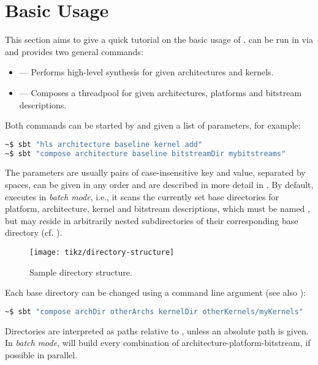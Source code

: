 \section{Basic Usage}\label{sec:basic-usage}%
This section aims to give a quick tutorial on the basic usage of \tapasco{}.
\tapasco{} can be run in \tapascohome{} via  and provides two general commands:

\begin{itemize}
  \item {} --- Performs high-level synthesis for given architectures and kernels.
  \item {} --- Composes a threadpool for given architectures, platforms and bitstream descriptions.
\end{itemize}

Both commands can be started by  and given a list of parameters, for example:
%
\begin{lstlisting}[language=bash]
~$ sbt "hls architecture baseline kernel add"
~$ sbt "compose architecture baseline bitstreamDir mybitstreams"
\end{lstlisting}
%
The parameters are usually pairs of case-insensitive key and value, separated by spaces, can be given in any order and are described in more detail in .
By default, \tapasco{} executes in \emph{batch mode}, i.e., it scans the currently set base directories for platform, architecture, kernel and bitstream descriptions, which must be named , but may reside in arbitrarily nested subdirectories of their corresponding base directory (cf. ).
%
\begin{figure}
  \centering%
  \texttt{[image: tikz/directory-structure]}
  \caption{Sample directory structure.}
  \label{fig:dirs}
\end{figure}
%
Each base directory can be changed using a command line argument (see also ):
%
\begin{lstlisting}[language=bash]
~$ sbt "compose archDir otherArchs kernelDir otherKernels/myKernels"
\end{lstlisting}
%
Directories are interpreted as paths relative to \tapascohome{}, unless an absolute path is given.
In \emph{batch mode}, \tapasco{} will build every combination of architecture-platform-bitstream, if possible in parallel.

